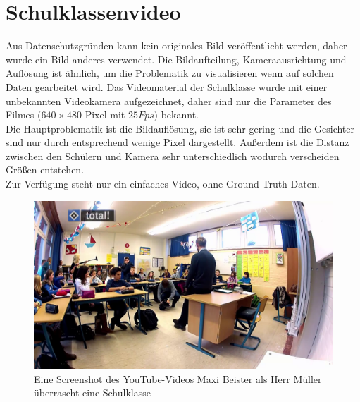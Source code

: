 \section{Schulklassenvideo}
\label{Schulvideo}
Aus Datenschutzgründen kann kein originales Bild veröffentlicht werden, daher wurde ein Bild anderes verwendet. Die Bildaufteilung, Kameraausrichtung und Auflösung ist ähnlich, um die Problematik zu visualisieren wenn auf solchen Daten gearbeitet wird. Das Videomaterial der Schulklasse wurde mit einer unbekannten Videokamera aufgezeichnet, daher sind nur die Parameter des Filmes $(640 \times 480$ Pixel mit $25Fps)$ bekannt.\\
Die Hauptproblematik ist die Bildauflösung, sie ist sehr gering und die Gesichter sind nur durch entsprechend wenige Pixel dargestellt. Außerdem ist die Distanz zwischen den Schülern und Kamera sehr unterschiedlich wodurch verscheiden Größen entstehen.\\
Zur Verfügung steht nur ein einfaches Video, ohne Ground-Truth Daten.
\begin{figure}
	\centering
	\includegraphics[width=0.7\linewidth]{img/Schulklasse}
	\caption{Eine Screenshot des YouTube-Videos \glqq Maxi Beister als Herr Müller überrascht eine Schulklasse\grqq \cite{Schulklasse_Video}}
	\label{fig:schulklasse}
\end{figure}
